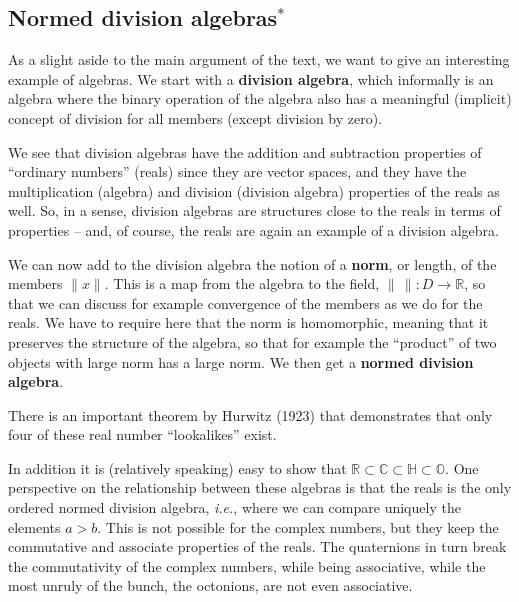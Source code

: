 \documentclass[notes.tex]{subfiles}
\begin{document}
\subsection{Normed division algebras$^*$}
\label{sec:normed_division_algebras}
As a slight aside to the main argument of the text, we want to give an interesting example of algebras. We start with a {\bf division algebra}, which informally is an algebra where the binary operation of the algebra also has a meaningful (implicit) concept of division for all members (except division by zero).

We see that division algebras have the addition and subtraction properties of ``ordinary numbers'' (reals) since they are vector spaces, and they have the  multiplication (algebra) and division (division algebra) properties of the reals as well. So, in a sense, division algebras are structures close to the reals in terms of properties -- and, of course, the reals are again an example of a division algebra. 

We can now add to the division algebra the notion of a {\bf norm}, or length, of the members $\|x\|$. This is a map from the algebra to the field, $\|\,\|:D\to\mathbb{R}$, so that we can discuss for example convergence of the members as we do for the reals. We have to require here that the norm is homomorphic, meaning that it preserves the structure of the algebra, so that for example the ``product''  of two objects with large norm has a large norm. We then get a {\bf normed division algebra}. 

There is an important theorem by Hurwitz (1923) that demonstrates that only four of these real number ``lookalikes'' exist.

In addition it is (relatively speaking) easy to show that $\mathbb{R} \subset\mathbb{C}\subset\mathbb{H}\subset\mathbb{O}$. One perspective on the relationship between these algebras is that the reals is the only ordered normed division algebra, {\it i.e.}, where we can compare uniquely the elements $a>b$. This is not possible for the complex numbers, but they keep the commutative and associate properties of the reals. The quaternions in turn break the commutativity of the complex numbers, while being associative, while the most unruly of the bunch, the octonions, are not even associative.
\end{document}
